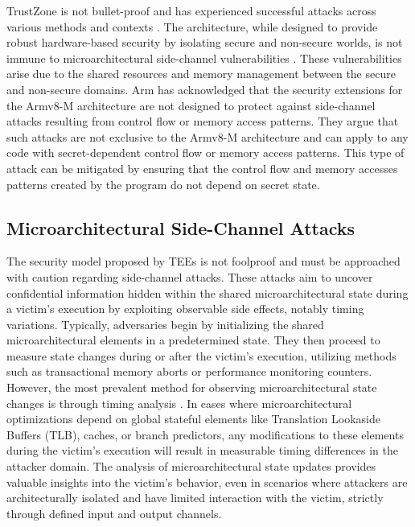 TrustZone is not bullet-proof and has experienced successful attacks across various methods and contexts \cite{DemystifyingAT, surveyonTEE, returntononsecure}. The architecture, while designed to provide robust hardware-based security by isolating secure and non-secure worlds, is not immune to microarchitectural side-channel vulnerabilities \cite{DemystifyingAT, busted, surveyonTEE, truspy, Bypassed}. These vulnerabilities arise due to the shared resources and memory management between the secure and non-secure domains. Arm \cite{armdeveloper} has acknowledged that the security extensions for the Armv8-M architecture are not designed to protect against side-channel attacks resulting from control flow or memory access patterns. They argue that such attacks are not exclusive to the Armv8-M architecture and can apply to any code with secret-dependent control flow or memory access patterns. This type of attack can be mitigated by ensuring that the control flow and memory accesses patterns created by the program do not depend on secret state.

\subsection{Microarchitectural Side-Channel Attacks}

The security model proposed by \gls{TEE}s is not foolproof and must be approached with caution regarding side-channel attacks. These attacks aim to uncover confidential information hidden within the shared microarchitectural state during a victim's execution by exploiting observable side effects, notably timing variations. Typically, adversaries begin by initializing the shared microarchitectural elements in a predetermined state. They then proceed to measure state changes during or after the victim's execution, utilizing methods such as transactional memory aborts or performance monitoring counters. However, the most prevalent method for observing microarchitectural state changes is through timing analysis \cite{vanbulckphdthesis}. In cases where microarchitectural optimizations depend on global stateful elements like Translation Lookaside Buffers (TLB), caches, or branch predictors, any modifications to these elements during the victim's execution will result in measurable timing differences in the attacker domain. The analysis of microarchitectural state updates provides valuable insights into the victim's behavior, even in scenarios where attackers are architecturally isolated and have limited interaction with the victim, strictly through defined input and output channels.

